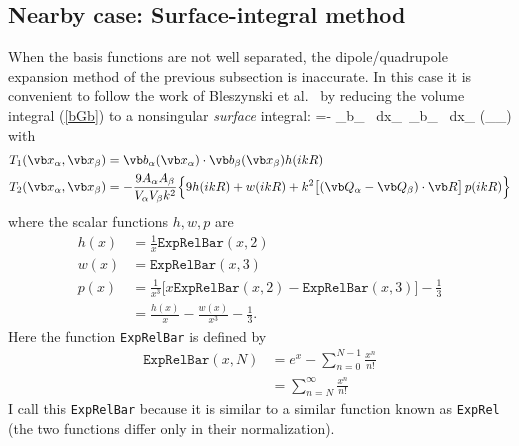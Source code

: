 \documentclass[letterpaper]{article}
\begin{document}
\subsection{Nearby case: Surface-integral method}
When the basis functions are not well separated, the
dipole/quadrupole expansion method of the previous 
subsection is inaccurate. In this case it is convenient 
to follow the work of Bleszynski et al.~\cite{Bleszynski2013}
by reducing the volume integral (\ref{bGb}) to a nonsingular 
\textit{surface} integral:
{
=- 
  \int_{\partial \sup \vb b_\alpha} \, \!\!\!\!\! d\vb x_\alpha \,
  \int_{\partial \sup \vb b_\alpha} \, \!\!\!\!\! d\vb x_\beta
  \Big(_\alpha \cdot {}_\beta\Big)
}
with
\begin{align*} 
     T_1(\vb x_\alpha, \vb x_\beta) 
  &= \vb b_\alpha(\vb x_\alpha ) \cdot \vb b_\beta(\vb x_\beta)
     h(ik R)
\\
     T_2(\vb x_\alpha, \vb x_\beta) 
  &= -\frac{9A_\alpha A_\beta}{V_\alpha V_\beta k^2}
      \Big\{ 9h(ikR) + w(ikR) 
             +k^2\big[(\vb Q_\alpha - \vb Q_\beta)\cdot \vb R\big]\,p(ikR)
      \Big\}
\end{align*} 
where the scalar functions $h,w,p$ are 
\begin{align*}
  h(x) &= \frac{1}{x}\texttt{ExpRelBar}(x,2) \\
  w(x) &= \texttt{ExpRelBar}(x,3) \\
  p(x) &= \frac{1}{x^3}\Big[ x\texttt{ExpRelBar}(x,2) 
                            - \texttt{ExpRelBar}(x,3)\Big] - \frac{1}{3}
\\
       &= \frac{h(x)}{x} - \frac{w(x)}{x^3} - \frac{1}{3}.
\end{align*}
Here the function \texttt{ExpRelBar} is defined by 
\begin{align*}
 \texttt{ExpRelBar}(x,N) 
&= e^{x} - \sum_{n=0}^{N-1} \frac{x^{n}}{n!}
\\
&= \sum_{n=N}^\infty \frac{x^n}{n!}
\end{align*}
I call this \texttt{ExpRelBar} because it is similar to
a similar function known as \texttt{ExpRel} (the two
functions differ only in their normalization). 
\end{document}
